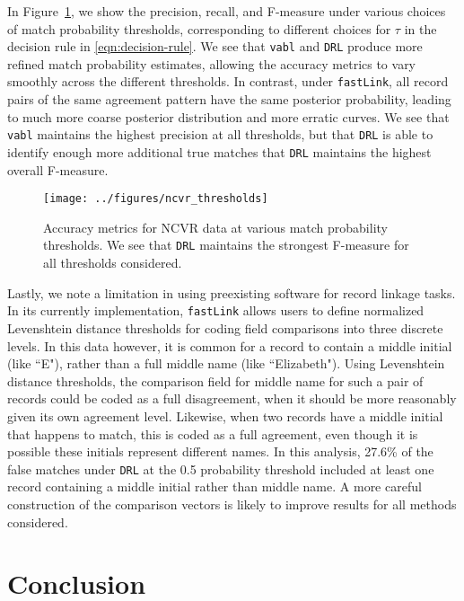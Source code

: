 \documentclass[12pt,letterpaper]{article}
\newcommand{\1}[1]{\mathbb{I}\!\left[#1\right]} %
\begin{document}
In Figure~\ref{fig:ncvr_thresholds}, we show the precision, recall, and F-measure under various choices of match probability thresholds, corresponding to different choices for $\tau$ in the decision rule in \eqref{eqn:decision-rule}. We see that \texttt{vabl} and \texttt{DRL} produce more refined match probability estimates, allowing the accuracy metrics to vary smoothly across the different thresholds. In contrast, under \texttt{fastLink}, all record pairs of the same agreement pattern have the same posterior probability, leading to much more coarse posterior distribution and more erratic curves. We see that \texttt{vabl} maintains the highest precision at all thresholds, but that \texttt{DRL} is able to identify enough more additional true matches that \texttt{DRL} maintains the highest overall F-measure.
\begin{figure}[t]
	\centering
	\texttt{[image: ../figures/ncvr\_thresholds]}
	\caption{Accuracy metrics for NCVR data at various match probability thresholds. We see that \texttt{DRL} maintains the strongest F-measure for all thresholds considered.}
	\label{fig:ncvr_thresholds}
\end{figure}

Lastly, we note a limitation in using preexisting software for record linkage tasks. In its currently implementation, \texttt{fastLink} allows users to define normalized Levenshtein distance thresholds for coding field comparisons into three discrete levels. In this data however, it is common for a record to contain a middle initial (like ``E"), rather than a full middle name (like ``Elizabeth"). Using Levenshtein distance thresholds, the comparison field for middle name for such a pair of records could be coded as a full disagreement, when it should be more reasonably given its own agreement level. Likewise, when two records have a middle initial that happens to match, this is coded as a full agreement, even though it is possible these initials represent different names. In this analysis, 27.6\% of the false matches under \texttt{DRL} at the 0.5 probability threshold included at least one record containing a middle initial rather than middle name. A more careful construction of the comparison vectors is likely to improve results for all methods considered.

\section{Conclusion}\label{sec:conclusion}
\end{document}
